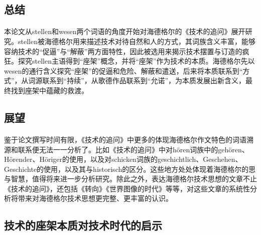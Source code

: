 \documentclass{article}
\begin{document}
	\subsection{总结}
		\paragraph{}
		本论文从stellen和wesen两个词语的角度开始对海德格尔的《技术的追问》展开研究。stellen被海德格尔用来描述技术对待自然和人的方式，其词族含义丰富，能够容纳技术的“促逼”与“解蔽”两方面特性，因此被选用来揭示技术摆置与订造的疯狂。探究stellen主语得到“座架”概念，并将“座架”作为技术的本质。海德格尔先以wesen的通行含义探究“座架”的促逼和危险、解蔽和遣送，后来将本质联系到“方式”，从词源联系到“持续”，从歌德作品联系到“允诺”，为本质发展出新含义，最终找到座架中蕴藏的救渡。
	\subsection{展望}
		\paragraph{}
		鉴于论文撰写时间有限，《技术的追问》中更多的体现海德格尔作文特色的词语溯源和联系便无法一一分析了。比如《技术的追问》中对hören词族中的gehören、Hörender、Höriger的使用，以及对schicken词族的geschichtlich、Geschehen、Geschichte的使用，以及其与historisch的区分。这些地方处处体现着海德格尔的思与智慧，值得将来进一步分析研究。除此之外，表达海德格尔技术思想的文章不止《技术的追问》，还包括《转向》《世界图像的时代》等等，对这些文章的系统性分析将带来对海德格尔技术思想更完整、更丰富的认识。
	\subsection{技术的座架本质对技术时代的启示}
		\paragraph{}
		
\renewcommand\refname{参考文献}


\end{document}
